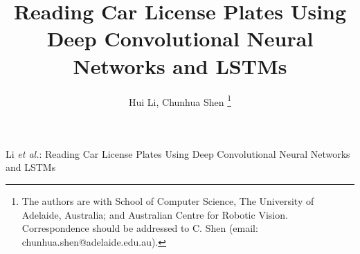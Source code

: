 \documentclass[twocolumn]{svjour3}
\begin{document}
\title{Reading Car License Plates
      Using Deep Convolutional Neural Networks and LSTMs}

\author{Hui Li,
        Chunhua Shen
\thanks{
  The authors are with School of Computer Science,
  The University of Adelaide, Australia; and  Australian Centre for Robotic Vision.
  Correspondence should be addressed to C. Shen (email: chunhua.shen@adelaide.edu.au).
}
}

\institute{}



%
{Li \MakeLowercase{\textit{et al.}}:
      Reading Car License Plates
      Using Deep Convolutional Neural Networks and LSTMs
}






\maketitle
\end{document}

